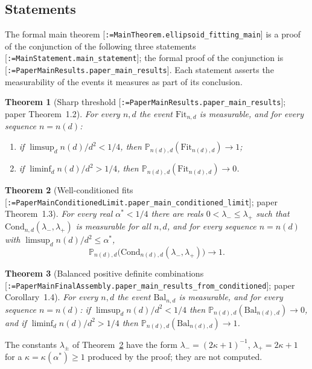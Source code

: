 \documentclass[11pt]{article}
\makeatletter
\newcommand{\formal@break}[1]{\@tfor\formal@tok:=#1\do{%
  \formal@tok
  \expandafter\ifx\formal@tok.\allowbreak\else
  \expandafter\ifx\formal@tok\_\allowbreak\fi\fi}}
\DeclareRobustCommand{\formal}[1]{\textnormal{[\texttt{\small\formal@break{#1}}]}}
\newcommand{\Prob}{\mathbb{P}}
\newcommand{\Fit}{\mathrm{Fit}}
\newcommand{\Cond}{\mathrm{Cond}}
\newcommand{\Bal}{\mathrm{Bal}}
\theoremstyle{plain}
\newtheorem{theorem}{Theorem}[section]
\theoremstyle{definition}
\makeatother
\begin{document}
\subsection{Statements}

The formal main theorem \formal{MainTheorem.ellipsoid\_fitting\_main} is a
proof of the conjunction of the following three statements
\formal{MainStatement.main\_statement}; the formal proof of the
conjunction is \formal{PaperMainResults.paper\_main\_results}. Each
statement asserts the measurability of the events it measures as part of
its conclusion.

\begin{theorem}[Sharp threshold \formal{PaperMainResults.paper\_main\_results}; paper Theorem~1.2]\label{thm:main}
For every $n, d$ the event $\Fit_{n,d}$ is measurable, and for every
sequence $n = n(d)$:
\begin{enumerate}
\item[(a)] if $\limsup_d n(d)/d^2 < 1/4$, then $\Prob_{n(d), d}(\Fit_{n(d), d}) \to 1$;
\item[(b)] if $\liminf_d n(d)/d^2 > 1/4$, then $\Prob_{n(d), d}(\Fit_{n(d), d}) \to 0$.
\end{enumerate}
\end{theorem}

\begin{theorem}[Well-conditioned fits \formal{PaperMainConditionedLimit.paper\_main\_conditioned\_limit}; paper Theorem~1.3]\label{thm:cond}
For every real $\alpha^* < 1/4$ there are reals $0 < \lambda_- \le \lambda_+$
such that $\Cond_{n,d}(\lambda_-, \lambda_+)$ is measurable for all $n, d$,
and for every sequence $n = n(d)$ with $\limsup_d n(d)/d^2 \le \alpha^*$,
\[
\Prob_{n(d), d}\bigl(\Cond_{n(d), d}(\lambda_-, \lambda_+)\bigr) \to 1 .
\]
\end{theorem}

\begin{theorem}[Balanced positive definite combinations \formal{PaperMainFinalAssembly.paper\_main\_results\_from\_conditioned}; paper Corollary~1.4]\label{thm:bal}
For every $n, d$ the event $\Bal_{n,d}$ is measurable, and for every
sequence $n = n(d)$: if $\limsup_d n(d)/d^2 < 1/4$ then
$\Prob_{n(d), d}(\Bal_{n(d), d}) \to 0$, and if $\liminf_d n(d)/d^2 > 1/4$
then $\Prob_{n(d), d}(\Bal_{n(d), d}) \to 1$.
\end{theorem}

The constants $\lambda_\pm$ of Theorem~\ref{thm:cond} have the form
$\lambda_- = (2\kappa + 1)^{-1}$, $\lambda_+ = 2\kappa + 1$ for a
$\kappa = \kappa(\alpha^*) \ge 1$ produced by the proof; they are not
computed.
\end{document}
